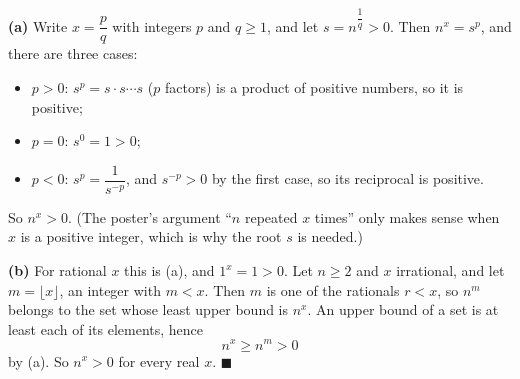 \textbf{(a)} Write $x=\dfrac pq$ with integers $p$ and $q\ge1$, and let $s=n^{\dfrac1q}>0$. Then $n^x=s^p$, and there are three cases:
\begin{itemize}
\item $p>0$: $s^p=s\cdot s\cdots s$ ($p$ factors) is a product of positive numbers, so it is positive;
\item $p=0$: $s^0=1>0$;
\item $p<0$: $s^p=\dfrac1{s^{-p}}$, and $s^{-p}>0$ by the first case, so its reciprocal is positive.
\end{itemize}
So $n^x>0$. (The poster's argument ``$n$ repeated $x$ times'' only makes sense when $x$ is a positive integer, which is why the root $s$ is needed.)

\textbf{(b)} For rational $x$ this is (a), and $1^x=1>0$. Let $n\ge2$ and $x$ irrational, and let $m=\lfloor x\rfloor$, an integer with $m<x$. Then $m$ is one of the rationals $r<x$, so $n^m$ belongs to the set whose least upper bound is $n^x$. An upper bound of a set is at least each of its elements, hence
\[n^x\ge n^m>0\]
by (a). So $n^x>0$ for every real $x$. $\blacksquare$
